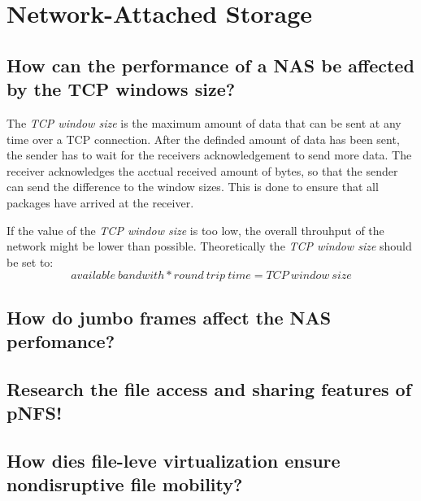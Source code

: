 \section{Network-Attached Storage} %
\label{sec:network_attached_storage}

\subsection{How can the performance of a NAS be affected by the TCP windows size?} %
\label{sub:how_can_the_performance_of_a_nas_be_affected_by_the_tcp_windows_size}
	The \emph{TCP window size} is the maximum amount of data
	that can be sent at any time over a TCP connection.
	After the definded amount of data has been sent,
	the sender has to wait for the receivers acknowledgement
	to send more data.
	The receiver acknowledges the acctual received amount of bytes,
	so that the sender can send the difference to the window sizes.
	This is done to ensure that all packages have arrived at the receiver.

	If the value of the \emph{TCP window size} is too low,
	the overall throuhput of the network might be lower than possible.
	Theoretically the \emph{TCP window size} should be set to:
	\begin{equation}
		available\ bandwith * round\ trip\ time = TCP\ window\ size
	\end{equation}
	
\subsection{How do jumbo frames affect the NAS perfomance?} %
\label{sub:how_do_jumbo_frames_affect_the_nas_perfomance}

\subsection{Research the file access and sharing features of pNFS!} %
\label{sub:research_the_file_access_and_sharing_features_of_pnfs}

\subsection{How dies file-leve virtualization ensure nondisruptive file mobility?} %
\label{sub:how_dies_file_leve_virtualization_ensure_nondisruptive_file_mobility}



